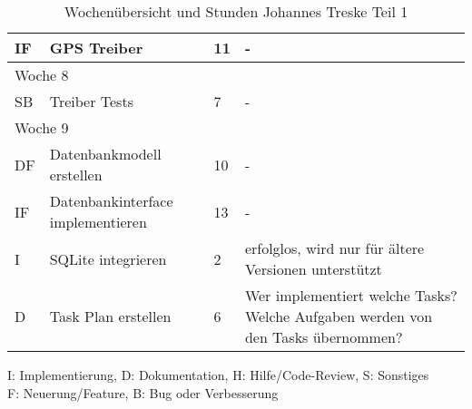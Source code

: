 \begin{table}[!hp]
\begin{center}
\begin{tabular}{|p{0.8cm}|p{6cm}|p{0.8cm}|p{8cm}|}
            IF           & GPS Treiber                                                          & 11            & -                                                                                \\ \hline
            \multicolumn{4}{|l|}{Woche 8}                                                                                                                                                          \\ \hline
            SB           & Treiber Tests                                                        & 7             & -                                                                                \\ \hline
            \multicolumn{4}{|l|}{Woche 9}                                                                                                                                                          \\ \hline
            DF           & Datenbankmodell erstellen                                            & 10            & -                                                                                \\
            IF           & Datenbankinterface implementieren                                    & 13            & -                                                                                \\
            I            & SQLite integrieren                                                   & 2             & erfolglos, wird nur für ältere Versionen unterstützt                             \\
            D            & Task Plan erstellen                                                  & 6             & Wer implementiert welche Tasks? Welche Aufgaben werden von den Tasks übernommen? \\ \hline
        \end{tabular}
        \label{tab:overviewJohannes1}
    \end{center}
    \caption{Wochenübersicht und Stunden Johannes Treske Teil 1}
    I: Implementierung, D: Dokumentation, H: Hilfe/Code-Review, S: Sonstiges\\
    F: Neuerung/Feature, B: Bug oder Verbesserung
\end{table}

